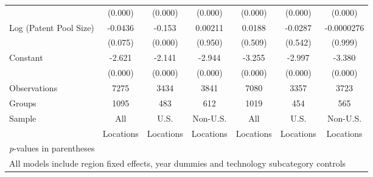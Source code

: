 {\begin{longtable}{l*{6}{c}}
                &  (0.000)&  (0.000)&  (0.000)&  (0.000)&  (0.000)&  (0.000)\\
Log (Patent Pool Size)&  -0.0436&   -0.153&  0.00211&   0.0188&  -0.0287&-0.0000276\\
                &  (0.075)&  (0.000)&  (0.950)&  (0.509)&  (0.542)&  (0.999)\\
Constant        &   -2.621&   -2.141&   -2.944&   -3.255&   -2.997&   -3.380\\
                &  (0.000)&  (0.000)&  (0.000)&  (0.000)&  (0.000)&  (0.000)\\
\hline
Observations    &     7275&     3434&     3841&     7080&     3357&     3723\\
Groups          &     1095&      483&      612&     1019&      454&      565\\
Sample&All &U.S. &Non-U.S.&All &U.S. &Non-U.S. \\
          &Locations &Locations&Locations&Locations &Locations&Locations \\
\hline\hline
\multicolumn{7}{l}{\footnotesize \textit{p}-values in parentheses}\\
\multicolumn{7}{l}{\footnotesize All models include region fixed effects, year dummies and technology subcategory controls}\\
\end{longtable}
}
